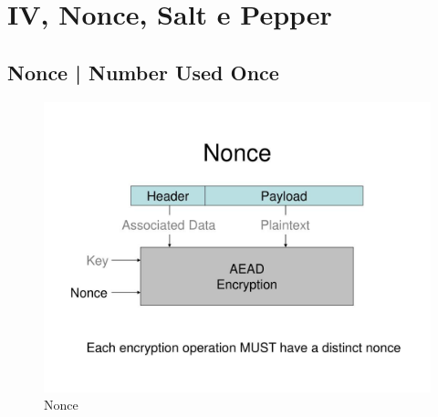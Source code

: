 
\textsf{\small }

\section{IV, Nonce, Salt e Pepper} %


\textsf{\small }

\subsection{Nonce | Number Used Once} %




\textsf{\small }

\begin{figure}[H]
	\centering
	\includegraphics[width=.9\textwidth, height=.9\textheight, keepaspectratio]{./images/iv_nonce_salt_pepper/nonce.png}
	\caption{Nonce}
	\label{fig:nonce}
\end{figure}


